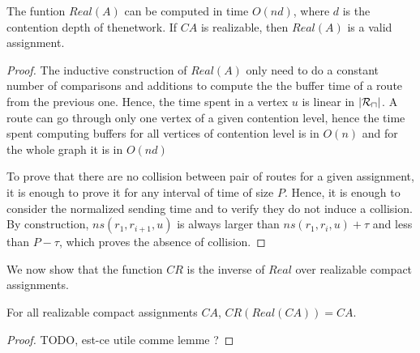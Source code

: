 \documentclass[english]{article}
\begin{document}
\begin{lemma}
The funtion $Real(A)$ can be computed in time $O(nd)$, where $d$ is the contention
depth of thenetwork. If $CA$ is realizable, then $Real(A)$ is a valid assignment.
\end{lemma}
\begin{proof}
The inductive construction of $Real(A)$ only need to do a constant number of comparisons and additions to compute the 
the buffer time of a route from the previous one. Hence, the time spent in a vertex $u$ is linear in $|\cal{R}_u|$. 
A route can go through only one vertex of a given contention level, hence the time spent computing buffers for all vertices
of contention level is in $O(n)$ and for the whole graph it is in $O(nd)$

To prove that there are no collision between pair of routes for a given assignment, it is enough to 
prove it for any interval of time of size $P$. Hence, it is enough to consider the normalized sending time and to verify
they do not induce a collision. By construction,  $ns(r_1,r_{i+1},u)$ is always larger than $ns(r_1,r_{i},u) + \tau$ and less 
than $P - \tau$, which proves the absence of collision.
\end{proof}

We now show that the function $CR$ is the inverse of $Real$ over realizable compact assignments.

\begin{lemma}
For all realizable compact assignments $CA$, $CR(Real(CA)) = CA$.
\end{lemma}
\begin{proof}
TODO, est-ce utile comme lemme ?
\end{proof}
\end{document}
